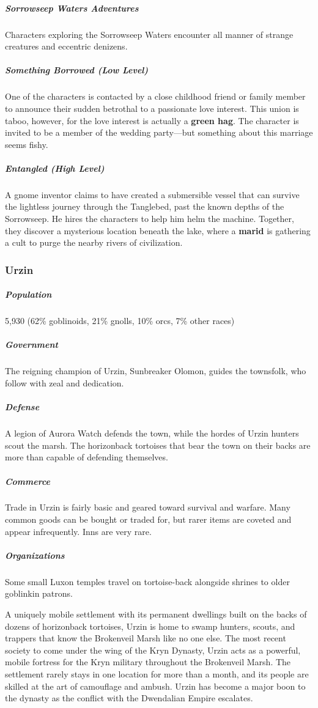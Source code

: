 \documentclass[10pt,a4paper,twoside,bg=print,twocolumn,openany,nodeprecatedcode]{dndbook}
\begin{document}
\subparagraph{Sorrowseep Waters Adventures}
Characters exploring the Sorrowseep Waters encounter all manner of strange creatures and eccentric denizens.

\subparagraph{Something Borrowed (Low Level)}
One of the characters is contacted by a close childhood friend or family member to announce their sudden betrothal to a passionate love interest. This union is taboo, however, for the love interest is actually a \textbf{green hag}. The character is invited to be a member of the wedding party—but something about this marriage seems fishy.

\subparagraph{Entangled (High Level)}
A gnome inventor claims to have created a submersible vessel that can survive the lightless journey through the Tanglebed, past the known depths of the Sorrowseep. He hires the characters to help him helm the machine. Together, they discover a mysterious location beneath the lake, where a \textbf{marid} is gathering a cult to purge the nearby rivers of civilization.

\subsubsection{Urzin}
\subparagraph{Population}
5,930 (62\% goblinoids, 21\% gnolls, 10\% orcs, 7\% other races)

\subparagraph{Government}
The reigning champion of Urzin, Sunbreaker Olomon, guides the townsfolk, who follow with zeal and dedication.

\subparagraph{Defense}
A legion of Aurora Watch defends the town, while the hordes of Urzin hunters scout the marsh. The horizonback tortoises that bear the town on their backs are more than capable of defending themselves.

\subparagraph{Commerce}
Trade in Urzin is fairly basic and geared toward survival and warfare. Many common goods can be bought or traded for, but rarer items are coveted and appear infrequently. Inns are very rare.

\subparagraph{Organizations}
Some small Luxon temples travel on tortoise-back alongside shrines to older goblinkin patrons.

A uniquely mobile settlement with its permanent dwellings built on the backs of dozens of horizonback tortoises, Urzin is home to swamp hunters, scouts, and trappers that know the Brokenveil Marsh like no one else. The most recent society to come under the wing of the Kryn Dynasty, Urzin acts as a powerful, mobile fortress for the Kryn military throughout the Brokenveil Marsh. The settlement rarely stays in one location for more than a month, and its people are skilled at the art of camouflage and ambush. Urzin has become a major boon to the dynasty as the conflict with the Dwendalian Empire escalates.
\end{document}
